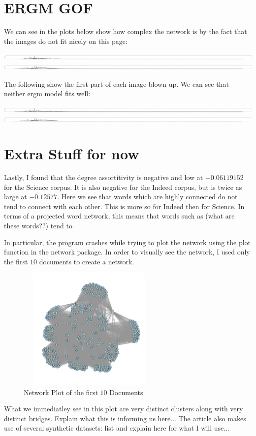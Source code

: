 \documentclass[12pt]{article}
\begin{document}
\section{ERGM GOF}
We can see in the plots below show how complex the network is by the fact that the images do not fit nicely on this page:
\vspace{2mm}
\begin{center} 
	\includegraphics[scale=0.05]{Images/Sci_fit2.pdf} 
	\includegraphics[scale=0.05]{Images/Indeed_fit2.pdf} 
\end{center} 
\vspace{2mm}
The following show the first part of each image blown up. We can see that neither ergm model fits well:
\vspace{2mm}
\begin{center} 
	\includegraphics[scale=0.5]{Images/Sci_fit2.pdf} 
	\includegraphics[scale=0.5]{Images/Indeed_fit2.pdf} 
\end{center} 
\vspace{2mm}
\section{Extra Stuff for now}
Lastly, I found that the degree assortitivity is negative and low at $ -0.06119152$ for the Science corpus. It is also negative for the Indeed corpus, but is twice as large at  $-0.12577$. Here we see that words which are highly connected do not tend to connect with each other. This is more so for Indeed then for Science. In terms of a projected word network, this means that words such as (what are these words??) tend to 
\par
In particular, the program crashes while trying to plot the network using the plot function in the network package. In order to visually see the network, I used only the first $10$ documents to create a network.

\begin{figure}[h!]
	\centering
	\includegraphics[width=70mm,height=60mm]{Images/simple_plot.pdf}
	\caption{Network Plot of the first $10$ Documents} 
\end{figure} 

What we immediatley see in this plot are very distinct clusters along with very distinct bridges. Explain what this is informing us here...
The article also makes use of several synthetic datasets: list and explain here for what I will use...
\end{document}
